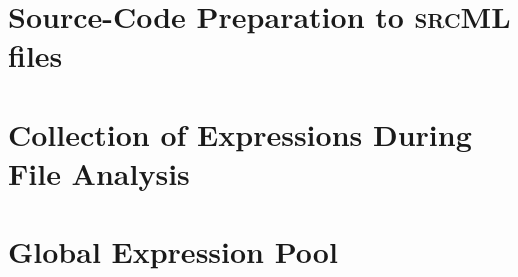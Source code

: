\documentclass[a4paper]{scrartcl}
\newcommand\code[1]{\texttt{#1}}
\newcommand\tool[1]{\textsc{#1}}
\newcommand\ifdeff[1]{\code{\##1}\xspace}
\newcommand\ifdef[0]{{\upshape\ifdeff{ifdef}}\xspace}
\begin{document}
\section{Source-Code Preparation to \tool{srcML} files}


\section{Collection of Expressions During File Analysis}


\section{Global Expression Pool}





\end{document}
